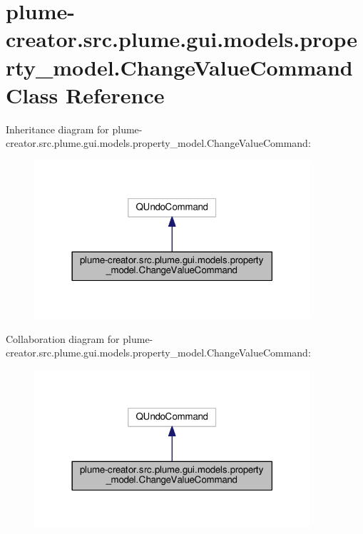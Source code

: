 \hypertarget{classplume-creator_1_1src_1_1plume_1_1gui_1_1models_1_1property__model_1_1_change_value_command}{}\section{plume-\/creator.src.\+plume.\+gui.\+models.\+property\+\_\+model.\+Change\+Value\+Command Class Reference}
\label{classplume-creator_1_1src_1_1plume_1_1gui_1_1models_1_1property__model_1_1_change_value_command}


Inheritance diagram for plume-\/creator.src.\+plume.\+gui.\+models.\+property\+\_\+model.\+Change\+Value\+Command\+:\nopagebreak
\begin{figure}[H]
\begin{center}
\leavevmode
\includegraphics[width=290pt]{classplume-creator_1_1src_1_1plume_1_1gui_1_1models_1_1property__model_1_1_change_value_command__inherit__graph}
\end{center}
\end{figure}


Collaboration diagram for plume-\/creator.src.\+plume.\+gui.\+models.\+property\+\_\+model.\+Change\+Value\+Command\+:\nopagebreak
\begin{figure}[H]
\begin{center}
\leavevmode
\includegraphics[width=290pt]{classplume-creator_1_1src_1_1plume_1_1gui_1_1models_1_1property__model_1_1_change_value_command__coll__graph}
\end{center}
\end{figure}
